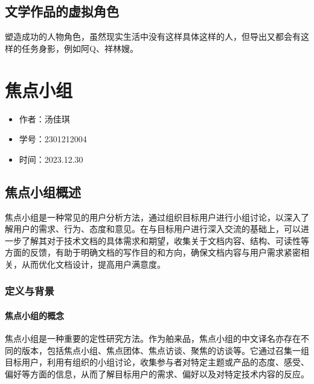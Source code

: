 \documentclass[letterpaper,10pt,english]{sphinxmanual}
\begin{document}
\section{文学作品的虚拟角色}
\label{\detokenize{user-research/persona:id2}}
\sphinxAtStartPar
塑造成功的人物角色，虽然现实生活中没有这样具体这样的人，但导出又都会有这样的任务身影，例如阿Q、祥林嫂。

\sphinxstepscope


\chapter{焦点小组}
\label{\detokenize{user-research/focus-group:id1}}\label{\detokenize{user-research/focus-group::doc}}\begin{itemize}
\item {} 
\sphinxAtStartPar
作者：汤佳琪

\item {} 
\sphinxAtStartPar
学号：2301212004

\item {} 
\sphinxAtStartPar
时间：2023.12.30

\end{itemize}


\section{焦点小组概述}
\label{\detokenize{user-research/focus-group:id2}}
\sphinxAtStartPar
焦点小组是一种常见的用户分析方法，通过组织目标用户进行小组讨论，以深入了解用户的需求、行为、态度和意见。在与目标用户进行深入交流的基础上，可以进一步了解其对于技术文档的具体需求和期望，收集关于文档内容、结构、可读性等方面的反馈，有助于明确文档的写作目的和方向，确保文档内容与用户需求紧密相关，从而优化文档设计，提高用户满意度。


\subsection{定义与背景}
\label{\detokenize{user-research/focus-group:id3}}

\subsubsection{焦点小组的概念}
\label{\detokenize{user-research/focus-group:id4}}
\sphinxAtStartPar
焦点小组是一种重要的定性研究方法。作为舶来品，焦点小组的中文译名亦存在不同的版本，包括焦点小组、焦点团体、焦点访谈、聚焦的访谈等。它通过召集一组目标用户，利用有组织的小组讨论，收集参与者对特定主题或产品的态度、感受、偏好等方面的信息，从而了解目标用户的需求、偏好以及对特定技术内容的反应。
\end{document}
